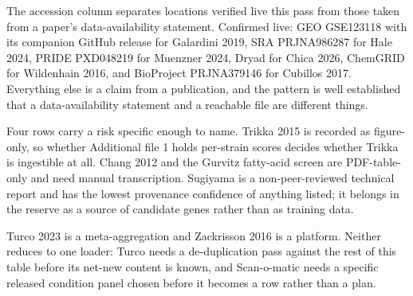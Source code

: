  The accession column separates
locations verified live this pass from those taken from a paper's data-availability
statement. Confirmed live: GEO GSE123118 with its companion GitHub release for
Galardini 2019, SRA PRJNA986287 for Hale 2024, PRIDE PXD048219 for Muenzner 2024, Dryad for
Chica 2026, ChemGRID for Wildenhain 2016, and BioProject PRJNA379146 for Cubillos 2017.
Everything else is a claim from a publication, and the pattern is well established that a
data-availability statement and a reachable file are different things.

Four rows carry a risk specific enough to name. Trikka 2015 is recorded as figure-only, so
whether Additional file 1 holds per-strain scores decides whether Trikka is ingestible at
all. Chang 2012 and the Gurvitz fatty-acid screen are PDF-table-only and need manual
transcription. Sugiyama is a non-peer-reviewed technical report and has the lowest
provenance confidence of anything listed; it belongs in the reserve as a source of candidate
genes rather than as training data.

 Turco 2023 is a meta-aggregation and Zackrisson
2016 is a platform. Neither reduces to one loader: Turco needs a de-duplication pass against
the rest of this table before its net-new content is known, and Scan-o-matic needs a
specific released condition panel chosen before it becomes a row rather than a plan.
